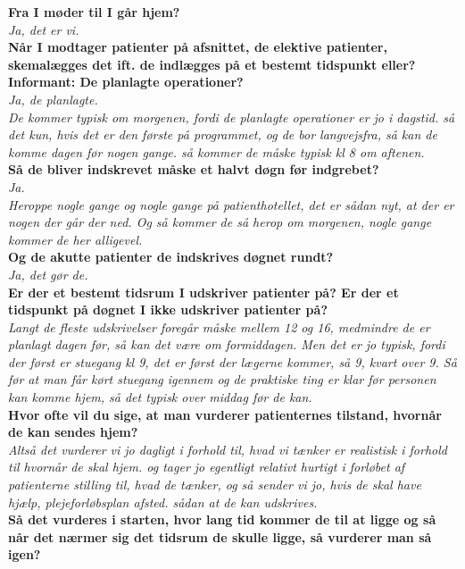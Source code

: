 \noindent
\textbf{Fra I møder til I går hjem?} \\
\noindent
\textit{Ja, det er vi.}  \\
\noindent
\textbf{Når I modtager patienter på afsnittet, de elektive patienter, skemalægges det ift. de indlægges på et bestemt tidspunkt eller?
Informant: De planlagte operationer?} \\
\noindent
\textit{Ja, de planlagte.} \\
\noindent
\textit{De kommer typisk om morgenen, fordi de planlagte operationer er jo i dagstid. så det kun, hvis det er den første på programmet, og de bor langvejsfra, så kan de komme dagen før nogen gange. så kommer de måske typisk kl 8 om aftenen.} \\
\noindent
\textbf{Så de bliver indskrevet måske et halvt døgn før indgrebet?} \\
\noindent
\textit{Ja.} \\
\noindent
\textit{Heroppe nogle gange og nogle gange på patienthotellet, det er sådan nyt, at der er nogen der går der ned. Og så kommer de så herop om morgenen, nogle gange kommer de her alligevel.} \\
\noindent
\textbf{Og de akutte patienter de indskrives døgnet rundt?} \\
\noindent
\textit{ Ja, det gør de.} \\
\noindent
\textbf{Er der et bestemt tidsrum I udskriver patienter på? Er der et tidspunkt på døgnet I ikke udskriver patienter på?} \\
\noindent
\textit{Langt de fleste udskrivelser foregår måske mellem 12 og 16, medmindre de er planlagt dagen før, så kan det være om formiddagen. Men det er jo typisk, fordi der først er stuegang kl 9, det er først der lægerne kommer, så 9, kvart over 9. Så før at man får kørt stuegang igennem og de praktiske ting er klar før personen kan komme hjem, så det typisk over middag før de kan. } \\
\noindent
\textbf{Hvor ofte vil du sige, at man vurderer patienternes tilstand, hvornår de kan sendes hjem?}  \\
\noindent
\textit{Altså det vurderer vi jo dagligt i forhold til, hvad vi tænker er realistisk i forhold til hvornår de skal hjem. og tager jo egentligt relativt hurtigt i forløbet af patienterne stilling til, hvad de tænker, og så sender vi jo, hvis de skal have hjælp, plejeforløbsplan afsted. sådan at de kan udskrives.} \\
\noindent
\textbf{Så det vurderes i starten, hvor lang tid kommer de til at ligge og så når det nærmer sig det tidsrum de skulle ligge, så vurderer man så igen?} \\
